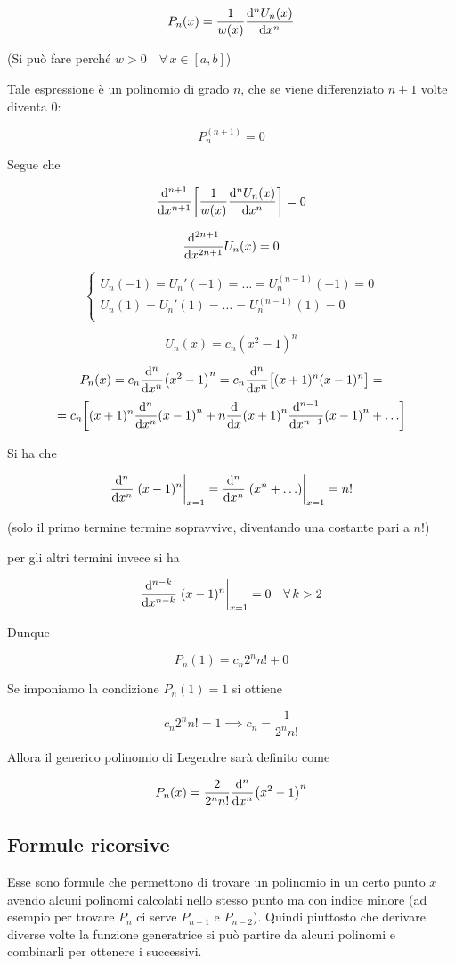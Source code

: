 $$P_n(x)=\frac{1}{w(x)} \dv[n]{U_n(x)}{x}$$

(Si può fare perché $w>0 \quad \forall \, x \in [a,b]$)

Tale espressione è un polinomio di grado $n$, che se viene differenziato $n+1$ volte diventa 0:

$$P_n^{(n+1)}=0$$

Segue che

$$\dv[n+1]{x} \qty[ \frac{1}{w(x)} \dv[n]{U_n(x)}{x} ]=0$$

$$\dv[2n+1]{x} U_n(x)=0$$

$$\begin{cases}
   U_n(-1)=U_n'(-1)=\ldots=U_n^{(n-1)}(-1)=0\\[0.1cm]
   U_n(1)=U_n'(1)=\ldots=U_n^{(n-1)}(1)=0\\
\end{cases}$$

$$U_n(x)=c_n (x^2 - 1)^n$$

$$P_n(x)=c_n \dv[n]{x} (x^2 - 1)^n
=c_n \dv[n]{x} \big[ (x + 1)^n (x - 1)^n \big]=$$
$$=c_n \qty[ (x+1)^n \dv[n]{x} (x - 1)^n + n \dv{x} (x+1)^n \dv[n-1]{x} (x-1)^n + \ldots]$$

Si ha che

$$\dv[n]{x} \eval{(x-1)^n}_{x=1}
=\dv[n]{x} \eval{(x^n + \ldots )}_{x=1}=n!$$

(solo il primo termine termine sopravvive, diventando una costante pari a $n!$)

per gli altri termini invece si ha

$$\dv[n-k]{x} \eval{(x-1)^n}_{x=1}=0 \quad \forall \, k>2$$

Dunque

$$P_n(1)=c_n 2^n n! + 0$$

Se imponiamo la condizione $P_n(1)=1$ si ottiene

$$c_n 2^n n!=1
\implies
c_n=\frac{1}{ 2^n n! }$$

Allora il generico polinomio di Legendre sarà definito come

$$P_n(x)=\frac{2}{ 2^n n! } \dv[n]{x} (x^2 - 1)^n$$

\subsection{Formule ricorsive}

Esse sono formule che permettono di trovare un polinomio in un certo punto $x$ avendo alcuni polinomi calcolati nello stesso punto ma con indice minore (ad esempio per trovare $P_n$ ci serve $P_{n-1}$ e $P_{n-2}$). Quindi piuttosto che derivare diverse volte la funzione generatrice si può partire da alcuni polinomi e combinarli per ottenere i successivi.

